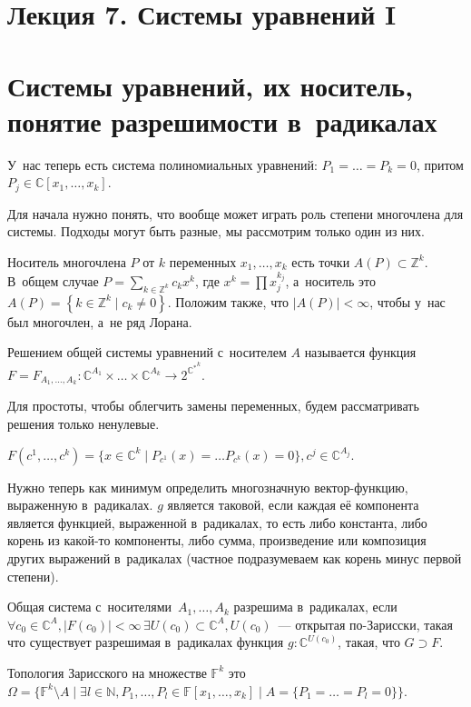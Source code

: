 \documentclass{article}
\begin{document}
\section*{Лекция 7. Системы уравнений I}

\section{Системы уравнений, их носитель, понятие разрешимости в~радикалах}

У~нас теперь есть система полиномиальных уравнений: $P_1 = \ldots = P_k = 0$,
притом $P_j \in \mathbb{C}[x_1, \ldots, x_k]$.

Для начала нужно понять, что вообще может играть роль степени многочлена для
системы. Подходы могут быть разные, мы рассмотрим только один из них.

Носитель многочлена $P$ от $k$ переменных $x_1, \ldots, x_k$ есть точки $A(P)
\subset \mathbb{Z}^k$. В~общем случае $P = \sum_{k \in \mathbb{Z}^k} c_k x^k$,
где $x^k = \prod x_j^{k_j}$, а~носитель это $A(P) = \left\{k \in \mathbb{Z}^k
\mid c_k \ne 0\right\}$. Положим также, что $|A(P)| < \infty$, чтобы у~нас был
многочлен, а~не ряд Лорана.

\begin{definition}
	Решением общей системы уравнений с~носителем $A$ называется функция $F =
	F_{A_1, \ldots, A_k}: \mathbb{C}^{A_1} \times \ldots \times
	{\mathbb{C}}^{A_k} \rightarrow 2^{{\mathbb{C}^\ast}^k}$.

	Для простоты, чтобы облегчить замены переменных, будем рассматривать решения
	только ненулевые.

	$F(c^1, \ldots, c^k) = \{x \in \mathbb{C}^k \mid P_{c^1}(x) = \ldots
	P_{c^k}(x) = 0\}, c^j \in \mathbb{C}^{A_j}$.
\end{definition}

\begin{definition}
	Нужно теперь как минимум определить многозначную вектор-функцию, выраженную
	в~радикалах. $g$ является таковой, если каждая её компонента является функцией,
	выраженной в~радикалах, то есть либо константа, либо корень из какой-то
	компоненты, либо сумма, произведение или композиция других выражений
	в~радикалах (частное подразумеваем как корень минус первой степени).

	Общая система с~носителями~$A_1, \ldots, A_k$ разрешима в~радикалах, если
	$\forall c_0 \in \mathbb{C}^A, |F(c_0)| < \infty\,\exists U(c_0) \subset
	\mathbb{C}^A, U(c_0)$~--- открытая по-Зарисски, такая что
	существует разрешимая в~радикалах функция $g: \mathbb{C}^{U(c_0)}$, такая,
	что $G \supset F$.
\end{definition}

\begin{remark}
	Топология Зарисского на множестве $\mathbb{F}^k$ это $\Omega = \{\mathbb{F}^k
	\setminus A \mid \exists l \in \mathbb{N}, P_1, \ldots, P_l \in
	\mathbb{F}[x_1, \ldots, x_k] \mid A = \{P_1 = \ldots = P_l = 0\}\}$.
\end{remark}
\end{document}
